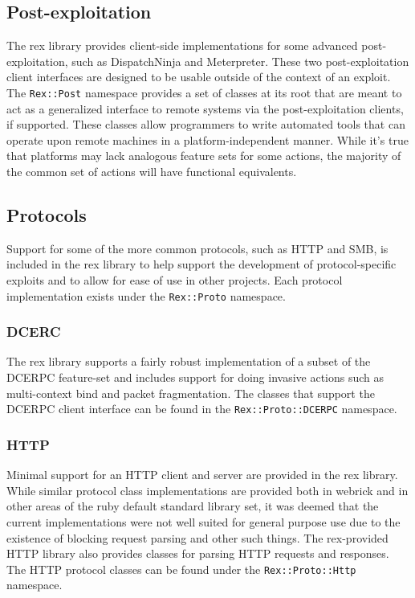 \documentclass{report}
\begin{document}
        \subsection{Post-exploitation}

\par
The rex library provides client-side implementations for some
advanced post-exploitation, such as DispatchNinja and Meterpreter.
These two post-exploitation client interfaces are designed to be
usable outside of the context of an exploit.  The \texttt{Rex::Post}
namespace provides a set of classes at its root that are meant to
act as a generalized interface to remote systems via the
post-exploitation clients, if supported.  These classes allow
programmers to write automated tools that can operate upon remote
machines in a platform-independent manner.  While it's true that
platforms may lack analogous feature sets for some actions, the
majority of the common set of actions will have functional
equivalents.

        \subsection{Protocols}

\par
Support for some of the more common protocols, such as HTTP and SMB,
is included in the rex library to help support the development of
protocol-specific exploits and to allow for ease of use in other
projects.  Each protocol implementation exists under the
\texttt{Rex::Proto} namespace.

            \subsubsection{DCERC}

\par
The rex library supports a fairly robust implementation of a subset
of the DCERPC feature-set and includes support for doing invasive
actions such as multi-context bind and packet fragmentation.  The
classes that support the DCERPC client interface can be found in the
\texttt{Rex::Proto::DCERPC} namespace.

            \subsubsection{HTTP}

\par
Minimal support for an HTTP client and server are provided in the
rex library.  While similar protocol class implementations are
provided both in webrick and in other areas of the ruby default
standard library set, it was deemed that the current implementations
were not well suited for general purpose use due to the existence of
blocking request parsing and other such things.  The rex-provided
HTTP library also provides classes for parsing HTTP requests and
responses.  The HTTP protocol classes can be found under the
\texttt{Rex::Proto::Http} namespace.
\end{document}
